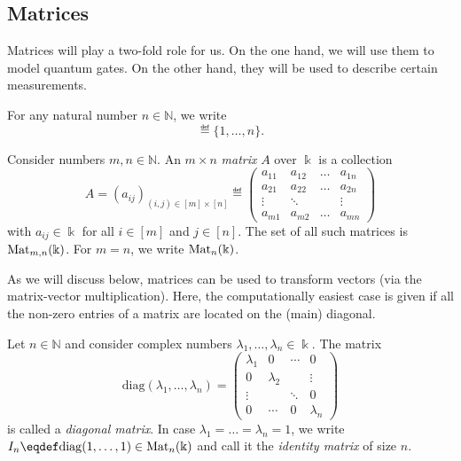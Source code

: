 \documentclass[a4paper, oneside, 12pt]{amsart}
\begin{document}
\subsection{Matrices}\label{sec:matrices}
Matrices will play a two-fold role for us.
On the one hand, we will use them to model quantum gates.
On the other hand, they will be used to describe certain measurements.
\bigskip

For any natural number  \(n \in \mathbb{N}\), we write
\begin{equation}
  [n] \eqdef \{1, \dots , n\}.
\end{equation}
\begin{definition}\label{def:matrices}
  Consider numbers \(m, n \in \mathbb{N}\).
  An \( m \times n \) \emph{matrix} \(A\) over \( \Bbbk \) is a collection
  \begin{equation}
    A= (a_{ij})_{(i, j) \in [m] \times [n]} \eqdef
    \begin{pmatrix}
      a_{11} & a_{12} & \dots & a_{1n} \\
      a_{21} & a_{22} & \dots & a_{2n} \\
      \vdots& \ddots & & \vdots\\
      a_{m1} & a_{m2} & \dots & a_{mn}
    \end{pmatrix}
  \end{equation}
  with \(a_{ij} \in \Bbbk\) for all \(i \in [m]\) and \(j \in [n]\).
  The set of all such matrices is \( \operatorname{Mat}_{m,n}(\Bbbk) \).
  For \( m = n \), we write \( \operatorname{Mat}_n(\Bbbk) \).
\end{definition}

As we will discuss below, matrices can be used to transform vectors (via the matrix-vector multiplication).
Here, the computationally easiest case is given if all the non-zero entries of a matrix are located on the (main) diagonal.
\begin{example}\label{ex:diagonal-matrices}
  Let \(n\in \mathbb{N}\) and consider complex numbers \(\lambda_{1}, \dots , \lambda_{n} \in \Bbbk\).
  The matrix
  \begin{equation}
    \mathrm{diag}(\lambda_{1}, \dots , \lambda_{n}) =
    \begin{pmatrix}
      \lambda_1 & 0 & \cdots & 0 \\
      0 & \lambda_2 & & \vdots \\
      \vdots & & \ddots & 0 \\
      0 & \cdots & 0 & \lambda_n
    \end{pmatrix}
  \end{equation}
  is called a \emph{diagonal matrix}.
  In case \(\lambda_{1}= \dots = \lambda_{n} = 1\), we write \(I_{n}\eqdef \mathrm{diag}(1, \dots ,1)\in \Mat_{n}(\Bbbk)\) and call it the \emph{identity matrix} of size \(n\).
\end{example}
\end{document}
